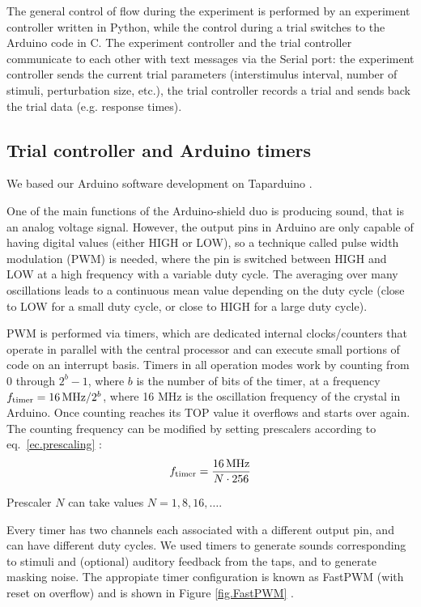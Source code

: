 \documentclass[twocolumn]{article}
\begin{document}
The general control of flow during the experiment is performed by an experiment controller written in Python, while the control during a trial switches to the Arduino code in C. The experiment controller and the trial controller communicate to each other with text messages via the Serial port: the experiment controller sends the current trial parameters (interstimulus interval, number of stimuli, perturbation size, etc.), the trial controller records a trial and sends back the trial data (e.g. response times).



\subsection{Trial controller and Arduino timers}
\label{sec.timers}

We based our Arduino software development on Taparduino \cite{Schultz2016}.

One of the main functions of the Arduino-shield duo is producing sound, that is an analog voltage signal. However, the output pins in Arduino are only capable of having digital values (either HIGH or LOW), so a technique called pulse width modulation (PWM) is needed, where the pin is switched between HIGH and LOW at a high frequency with a variable duty cycle. The averaging over many oscillations leads to a continuous mean value depending on the duty cycle (close to LOW for a small duty cycle, or close to HIGH for a large duty cycle).

PWM is performed via timers, which are dedicated internal clocks/counters that operate in parallel with the central processor and can execute small portions of code on an interrupt basis. Timers in all operation modes work by counting from 0 through $2^b-1$, where $b$ is the number of bits of the timer, at a frequency $f_{\mbox{\scriptsize timer}} = 16\,\mbox{MHz}/2^b$, where 16 MHz is the oscillation frequency of the crystal in Arduino. Once counting reaches its TOP value it overflows and starts over again. The counting frequency can be modified by setting prescalers according to eq.\ \ref{ec.prescaling} \cite{arduinomanual}:
\begin{equation}
    f_{\mbox{\scriptsize timer}} = \frac{16\,\mbox{MHz}}{N \cdot 256}
    \label{ec.prescaling}
\end{equation}

\noindent Prescaler $N$ can take values $N=1,8,16,\dots$.

Every timer has two channels each associated with a different output pin, and can have different duty cycles. We used timers to generate sounds corresponding to stimuli and (optional) auditory feedback from the taps, and to generate masking noise. The appropiate timer configuration is known as FastPWM (with reset on overflow) and is shown in Figure \ref{fig.FastPWM} \cite{TimersOVF}.
\end{document}

